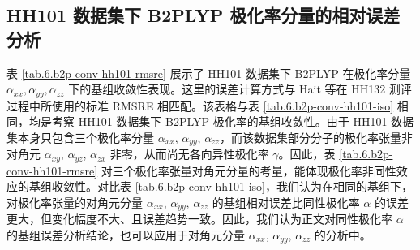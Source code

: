 \subsection{HH101 数据集下 B2PLYP 极化率分量的相对误差分析}

表 \ref{tab.6.b2p-conv-hh101-rmsre} 展示了 HH101 数据集下 B2PLYP 在极化率分量 $\alpha_{xx}, \alpha_{yy}, \alpha_{zz}$ 下的基组收敛性表现。这里的误差计算方式与 Hait 等\cite{Hait-Head-Gordon.PCCP.2018}在 HH132 测评过程中所使用的标准 RMSRE 相匹配。该表格与表 \ref{tab.6.b2p-conv-hh101-iso} 相同，均是考察 HH101 数据集下 B2PLYP 极化率的基组收敛性。由于 HH101 数据集本身只包含三个极化率分量 $\alpha_{xx}$, $\alpha_{yy}$, $\alpha_{zz}$，而该数据集部分分子的极化率张量非对角元 $\alpha_{xy}$, $\alpha_{yz}$, $\alpha_{zx}$ 非零，从而尚无各向异性极化率 $\gamma$。因此，表 \ref{tab.6.b2p-conv-hh101-rmsre} 对三个极化率张量对角元分量的考量，能体现极化率非同性效应的基组收敛性。对比表 \ref{tab.6.b2p-conv-hh101-iso}，我们认为在相同的基组下，对极化率张量的对角元分量 $\alpha_{xx}$, $\alpha_{yy}$, $\alpha_{zz}$ 的基组相对误差比同性极化率 $\alpha$ 的误差更大，但变化幅度不大、且误差趋势一致。因此，我们认为正文对同性极化率 $\alpha$ 的基组误差分析结论，也可以应用于对角元分量 $\alpha_{xx}$, $\alpha_{yy}$, $\alpha_{zz}$ 的分析中。

